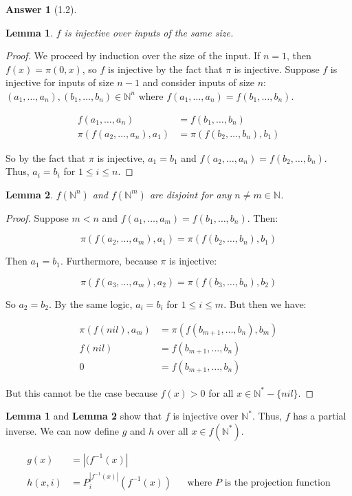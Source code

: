 \documentclass[11pt]{article}
\theoremstyle{plain}
\newtheorem{lem}{Lemma}
\theoremstyle{definition}
\newtheorem*{ans}{Answer}
\newcommand{\N}{\mathbb{N}}
\begin{document}
\begin{ans}[1.2]
    \begin{lem}
        $f$ is injective over inputs of the same size.
    \end{lem}
    \begin{proof}
        We proceed by induction over the size of the input. If $n = 1$, then $f(x) = \pi(0, x)$, so $f$ is injective by 
        the fact that $\pi$ is injective. Suppose $f$ is injective for inputs of size $n - 1$ and consider inputs of size $n$:
        $(a_1, \ldots, a_n), (b_1, \ldots, b_n) \in \N^n$ where $f(a_1, \ldots, a_n) = f(b_1, \ldots, b_n)$.

        \begin{align*}
            f(a_1, \ldots, a_n) &= f(b_1, \ldots, b_n)\\
            \pi(f(a_2, \ldots, a_n), a_1) &= \pi(f(b_2, \ldots, b_n), b_1)
        \end{align*}

        So by the fact that $\pi$ is injective, $a_1 = b_1$ and $f(a_2, \ldots, a_n) = f(b_2, \ldots, b_n)$. 
        Thus, $a_i = b_i$ for $1 \leq i \leq n$.
    \end{proof}

    \begin{lem}
        $f(\N^n)$ and $f(\N^m)$ are disjoint for any $n \neq m \in \N$.
    \end{lem}
    \begin{proof}
        Suppose $m < n$ and $f(a_1, \ldots, a_m) = f(b_1, \ldots, b_n)$. Then:

        $$\pi(f(a_2, \ldots, a_m), a_1) = \pi(f(b_2, \ldots, b_n), b_1)$$

        Then $a_1 = b_1$. Furthermore, because $\pi$ is injective:

        $$\pi(f(a_3, \ldots, a_m), a_2) = \pi(f(b_3, \ldots, b_n), b_2)$$

        So $a_2 = b_2$. By the same logic, $a_i = b_i$ for $1 \leq i \leq m$. But then we have:

        \begin{align*}
            \pi(f(nil), a_m) &= \pi(f(b_{m + 1}, \ldots, b_n), b_m)\\
            f(nil) &= f(b_{m + 1}, \ldots, b_n)\\
            0 &= f(b_{m + 1}, \ldots, b_n)
        \end{align*}

        But this cannot be the case because $f(x) > 0$ for all $x \in \N^* - \{nil\}$.
    \end{proof}

    {\bf Lemma 1} and {\bf Lemma 2} show that $f$ is injective over $\N^*$. Thus, $f$ has a partial inverse. We can now define
    $g$ and $h$ over all $x \in f(\N^*)$.

    \begin{align*}
        g(x) &= |(f^{-1}(x)|\\
        h(x, i) &= P^{|f^{-1}(x)|}_i(f^{-1}(x)) && \text{where } P \text{ is the projection function}
    \end{align*}
\end{ans}
\end{document}
